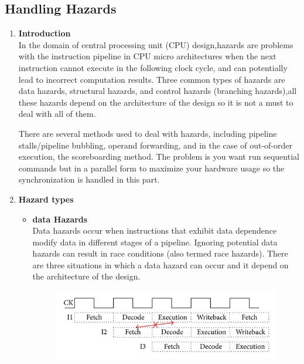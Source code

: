 \documentclass[../main.tex]{subfiles}
\begin{document}
\subsection{Handling Hazards}
\begin{enumerate}
\item \textbf{Introduction}\\
In the domain of central processing unit (CPU) design,hazards are problems with the instruction pipeline in CPU micro architectures when the next instruction cannot execute in the following clock cycle, and can potentially lead to incorrect computation results. Three common types of hazards are data hazards, structural hazards, and control hazards (branching hazards),all these hazards depend on the architecture of the design so it is not a must to deal with all of them.

There are several methods used to deal with hazards, including pipeline stalls/pipeline bubbling, operand forwarding, and in the case of out-of-order execution, the scoreboarding method.
The problem is you want run sequential commands but in a parallel form to maximize your hardware usage so the synchronization is handled in this part.

\item \textbf{Hazard types}

\begin{itemize}
     \item \textbf{data Hazards}\\

        Data hazards occur when instructions that exhibit data dependence modify data in different stages of a pipeline. Ignoring potential data hazards can result in race conditions (also termed race hazards). There are three situations in which a data hazard can occur and it depend on the architecture of the design.\\
        
   \begin{figure}[bh]
\centering
\includegraphics[scale=2]{diagrams/hazardcondition.jpg}


\end{figure}
\end{itemize}
\end{enumerate}
\end{document}
